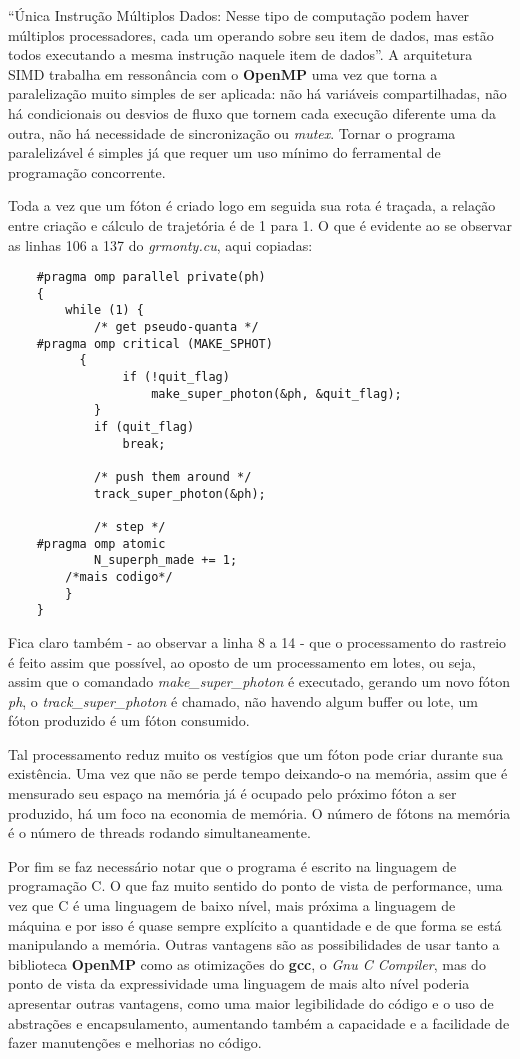   ``Única Instrução Múltiplos Dados: Nesse tipo de computação podem haver múltiplos processadores, cada um operando sobre seu item de dados, mas estão todos executando a mesma instrução naquele item de dados''\citep[p.84, traduzido]{HCP:16}. A arquitetura SIMD trabalha em ressonância com o \textbf{OpenMP} uma vez que torna a paralelização muito simples de ser aplicada: não há variáveis compartilhadas, não há condicionais ou desvios de fluxo que tornem cada execução diferente uma da outra, não há necessidade de sincronização ou \textit{mutex}. Tornar o programa paralelizável é simples já que requer um uso mínimo do ferramental de programação concorrente.


  Toda a vez que um fóton é criado logo em seguida sua rota é traçada, a relação entre criação e cálculo de trajetória é de 1 para 1. O que é evidente ao se observar as linhas 106 a 137 do \textit{grmonty.cu}, aqui copiadas:

  \label{sec:main_loop}
  \begin{lstlisting}
    #pragma omp parallel private(ph)
  	{
  		while (1) {
  			/* get pseudo-quanta */
    #pragma omp critical (MAKE_SPHOT)
  		  {
  				if (!quit_flag)
  					make_super_photon(&ph, &quit_flag);
  			}
  			if (quit_flag)
  				break;

  			/* push them around */
  			track_super_photon(&ph);

  			/* step */
    #pragma omp atomic
  			N_superph_made += 1;
        /*mais codigo*/
  		}
  	}
  \end{lstlisting}

  Fica claro também - ao observar a linha 8 a 14 - que o processamento do rastreio é feito assim que possível, ao oposto de um processamento em lotes, ou seja, assim que o comandado \textit{make\_super\_photon} é executado, gerando um novo fóton \textit{ph}, o  \textit{track\_super\_photon} é chamado, não havendo algum buffer ou lote, um fóton produzido é um fóton consumido.

  Tal processamento reduz muito os vestígios que um fóton pode criar durante sua existência. Uma vez que não se perde tempo deixando-o na memória, assim que é mensurado seu espaço na memória já é ocupado pelo próximo fóton a ser produzido, há um foco na economia de memória. O número de fótons na memória é o número de threads rodando simultaneamente.

  Por fim se faz necessário notar que o programa é escrito na linguagem de programação C. O que faz muito sentido do ponto de vista de performance, uma vez que C é uma linguagem de baixo nível, mais próxima a linguagem de máquina e por isso é quase sempre explícito a quantidade e de que forma se está manipulando a memória. Outras vantagens são as possibilidades de usar tanto a biblioteca \textbf{OpenMP} como as otimizações do \textbf{gcc}, o \textit{Gnu C Compiler}, mas do ponto de vista da expressividade uma linguagem de mais alto nível poderia apresentar outras vantagens, como uma maior legibilidade do código e o uso de abstrações e encapsulamento, aumentando também a capacidade e a facilidade de fazer manutenções e melhorias no código.

